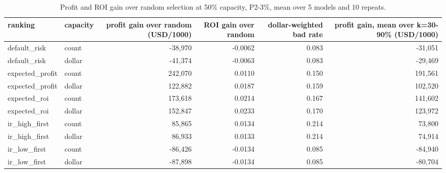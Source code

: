 \begin{table}[t]
\centering
\caption{Profit and ROI gain over random selection at 50\% capacity, P2-3\%, mean over 5 models and 10 repeats.}
\label{tab:T8a_capacity_d3}
\small
\begin{tabular}{llrrrr}
\toprule
ranking & capacity & profit gain over random (USD/1000) & ROI gain over random & dollar-weighted bad rate & profit gain, mean over k=30-90\% (USD/1000) \\
\midrule
default\_risk & count & -38,970 & -0.0062 & 0.083 & -31,051 \\
default\_risk & dollar & -41,374 & -0.0063 & 0.083 & -29,469 \\
expected\_profit & count & 242,070 & 0.0110 & 0.150 & 191,561 \\
expected\_profit & dollar & 122,882 & 0.0187 & 0.159 & 102,520 \\
expected\_roi & count & 173,618 & 0.0214 & 0.167 & 141,602 \\
expected\_roi & dollar & 152,847 & 0.0233 & 0.170 & 123,972 \\
ir\_high\_first & count & 85,865 & 0.0134 & 0.214 & 73,800 \\
ir\_high\_first & dollar & 86,933 & 0.0133 & 0.214 & 74,914 \\
ir\_low\_first & count & -86,426 & -0.0134 & 0.085 & -84,940 \\
ir\_low\_first & dollar & -87,898 & -0.0134 & 0.085 & -80,704 \\
\bottomrule
\end{tabular}
\end{table}
